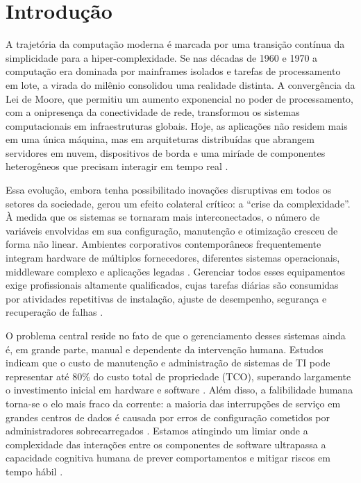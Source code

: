 \section{Introdução}
\label{sec:introducao}

A trajetória da computação moderna é marcada por uma transição contínua da simplicidade para a hiper-complexidade. Se nas décadas de 1960 e 1970 a computação era dominada por mainframes isolados e tarefas de processamento em lote, a virada do milênio consolidou uma realidade distinta. A convergência da Lei de Moore, que permitiu um aumento exponencial no poder de processamento, com a onipresença da conectividade de rede, transformou os sistemas computacionais em infraestruturas globais. Hoje, as aplicações não residem mais em uma única máquina, mas em arquiteturas distribuídas que abrangem servidores em nuvem, dispositivos de borda e uma miríade de componentes heterogêneos que precisam interagir em tempo real \cite{lalanda2013}.

Essa evolução, embora tenha possibilitado inovações disruptivas em todos os setores da sociedade, gerou um efeito colateral crítico: a ``crise da complexidade''. À medida que os sistemas se tornaram mais interconectados, o número de variáveis envolvidas em sua configuração, manutenção e otimização cresceu de forma não linear. Ambientes corporativos contemporâneos frequentemente integram hardware de múltiplos fornecedores, diferentes sistemas operacionais, middleware complexo e aplicações legadas \cite{kephart2003}. Gerenciar todos esses equipamentos exige profissionais altamente qualificados, cujas tarefas diárias são consumidas por atividades repetitivas de instalação, ajuste de desempenho, segurança e recuperação de falhas \cite{ibm2001}.

O problema central reside no fato de que o gerenciamento desses sistemas ainda é, em grande parte, manual e dependente da intervenção humana. Estudos indicam que o custo de manutenção e administração de sistemas de TI pode representar até 80\% do custo total de propriedade (TCO), superando largamente o investimento inicial em hardware e software \cite{sterritt2005}. Além disso, a falibilidade humana torna-se o elo mais fraco da corrente: a maioria das interrupções de serviço em grandes centros de dados é causada por erros de configuração cometidos por administradores sobrecarregados \cite{correa2007}. Estamos atingindo um limiar onde a complexidade das interações entre os componentes de software ultrapassa a capacidade cognitiva humana de prever comportamentos e mitigar riscos em tempo hábil \cite{kephart2003}.

